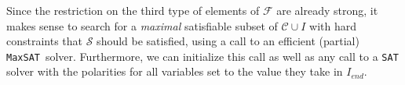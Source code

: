 \documentclass[twoside,11pt]{article}
\newcommand\m[1]{\mathcal{#1}}
\newcommand\F{\ensuremath{\m{F} }\xspace}
\newcommand\Iend{\ensuremath{I_\mathit{end} }\xspace}
\newcommand\formula{\ensuremath{\m{F} }\xspace}
\newcommand\formulac{\ensuremath{\m{C} }\xspace}
\newcommand\mm[1]{\ensuremath{#1}\xspace}
\newcommand\call[1]{\mm{\texttt{#1}}}
\newcommand\sat{\texttt{{SAT}}\xspace}
\newcommand\grow{\mm{\call{Grow}}}
\newcommand\maxsat{\texttt{MaxSAT}}
\begin{document}
Since the restriction on the third type of elements of $\formula$ are already strong, it makes sense %
to search for a \emph{maximal} satisfiable subset of $\formulac\cup I$ with hard constraints that $\m{S}$ should be satisfied, using a call to an efficient (partial) \maxsat~solver. 
Furthermore, we can initialize this call as well as any call to a \sat solver with the polarities for all variables set to the value they take in $\Iend$. 




\end{document}

